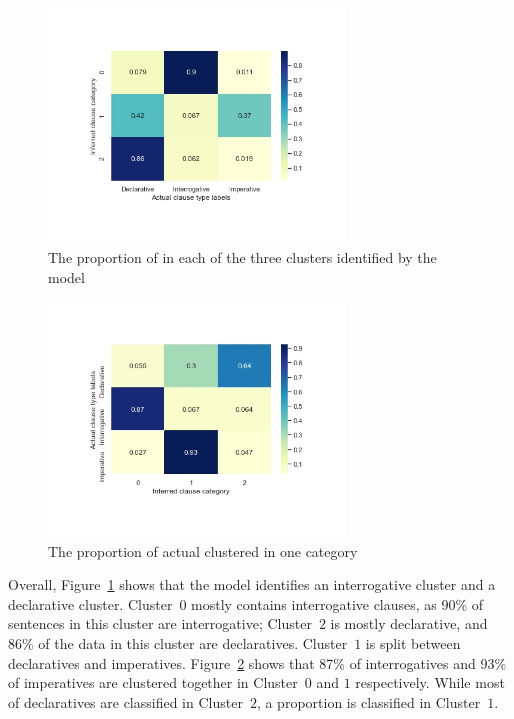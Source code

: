 \begin{figure}[H]
    \centering
    \includegraphics[width=0.7\textwidth]{figures/baseline-heatmap.jpg}
    \caption{The proportion of \diis{} in each of the three clusters identified by the \dlearnerabbr{} model}
    \label{fig:baseline-heatmap}
\end{figure}


\begin{figure}[H]
    \centering
    \includegraphics[width=0.7\textwidth]{figures/baseline-heatrev.jpg}
    \caption{The proportion of actual \diis{} clustered in one category}
    \label{fig:baseline-heatrev}
\end{figure}


Overall, Figure~\ref{fig:baseline-heatmap} shows that the \dlearnerabbr{} model identifies an interrogative cluster and a declarative cluster. Cluster~$0$ mostly contains interrogative clauses, as 90\% of sentences in this cluster are interrogative; Cluster~$2$ is mostly declarative, and 86\% of the data in this cluster are declaratives. Cluster~$1$ is split between declaratives and imperatives. Figure~\ref{fig:baseline-heatrev} shows that 87\% of interrogatives and 93\% of imperatives are clustered together in Cluster~$0$ and $1$ respectively. While most of declaratives are classified in Cluster~$2$, a proportion is classified in Cluster~$1$.

